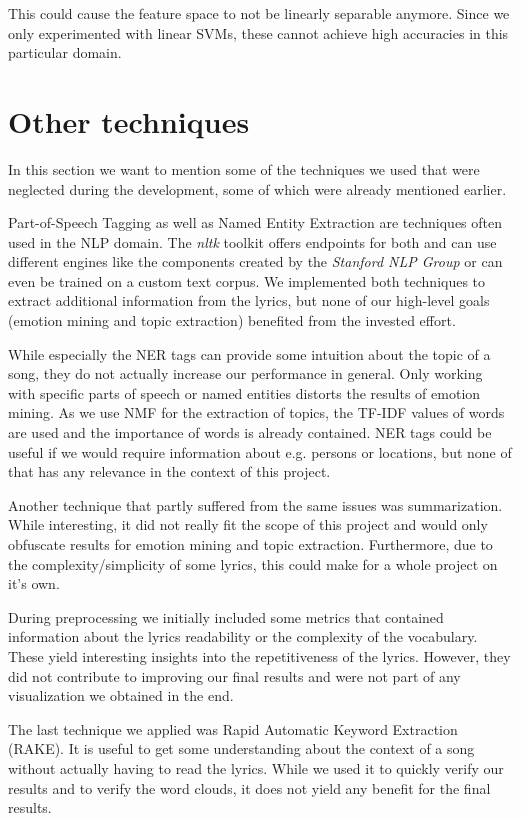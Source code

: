 \documentclass[10pt,a4paper]{article}
\begin{document}
		This could cause the feature space to not be linearly separable anymore. Since we only experimented with linear SVMs, these cannot achieve high accuracies in this particular domain.
	
	\section{Other techniques}
	\label{sec:othertechniques}
	In this section we want to mention some of the techniques we used that were neglected during the development, some of which were already mentioned earlier.
	
	Part-of-Speech Tagging as well as Named Entity Extraction are techniques often used in the NLP domain. The \textit{nltk} toolkit offers endpoints for both and can use different engines like the components created by the \textit{Stanford NLP Group} or can even be trained on a custom text corpus. We implemented both techniques to extract additional information from the lyrics, but none of our high-level goals (emotion mining and topic extraction) benefited from the invested effort. 
	
	While especially the NER tags can provide some intuition about the topic of a song, they do not actually increase our performance in general. Only working with specific parts of speech or named entities distorts the results of emotion mining. As we use NMF for the extraction of topics, the TF-IDF values of words are used and the importance of words is already contained. NER tags could be useful if we would require information about e.g. persons or locations, but none of that has any relevance in the context of this project.
	
	Another technique that partly suffered from the same issues was summarization. While interesting, it did not really fit the scope of this project and would only obfuscate results for emotion mining and topic extraction. Furthermore, due to the complexity/simplicity of some lyrics, this could make for a whole project on it's own.
	
	During preprocessing we initially included some metrics that contained information about the lyrics readability or the complexity of the vocabulary. These yield interesting insights into the repetitiveness of the lyrics. However, they did not contribute to improving our final results and were not part of any visualization we obtained in the end.
	
	The last technique we applied was Rapid Automatic Keyword Extraction (RAKE). It is useful to get some understanding about the context of a song without actually having to read the lyrics. While we used it to quickly verify our results and to verify the word clouds, it does not yield any benefit for the final results.
	
\end{document}
